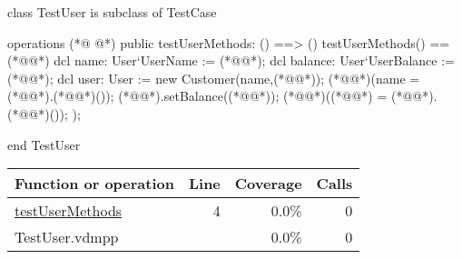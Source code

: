 \begin{vdmpp}[breaklines=true]
class TestUser is subclass of TestCase

operations
(*@
\label{testUserMethods:4}
@*)
 public testUserMethods: () ==> ()
 testUserMethods() == (*@\vdmnotcovered{(}@*)
  dcl name: User`UserName := (*@@*);
  dcl balance: User`UserBalance := (*@@*); 
  dcl user: User := new Customer(name,(*@@*));
  (*@@*)(name = (*@@*).(*@@*)()); 
  (*@@*).setBalance((*@@*));
  (*@@*)((*@@*) = (*@@*).(*@@*)());
 );

end TestUser
\end{vdmpp}
\bigskip
\begin{longtable}{|l|r|r|r|}
\hline
Function or operation & Line & Coverage & Calls \\
\hline
\hline
\hyperref[testUserMethods:4]{testUserMethods} & 4&0.0\% & 0 \\
\hline
\hline
TestUser.vdmpp & & 0.0\% & 0 \\
\hline
\end{longtable}

